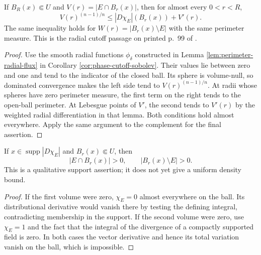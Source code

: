 \begin{proposition}\label{prop:phase-radial-sobolev}
If $B_R(x)\Subset U$ and $V(r)=|E\cap B_r(x)|$, then for almost every $0<r<R$,
\[
 V(r)^{(n-1)/n}\leq |D\chi_E|(B_r(x))+V'(r).
\]
The same inequality holds for $W(r)=|B_r(x)\setminus E|$ with the same perimeter measure. This is the radial cutoff passage on printed p.~99 of \cite{Sim18}.
\end{proposition}
\begin{proof}
Use the smooth radial functions $\phi_\delta$ constructed in Lemma \ref{lem:perimeter-radial-flux} in Corollary \ref{cor:phase-cutoff-sobolev}. Their values lie between zero and one and tend to the indicator of the closed ball. Its sphere is volume-null, so dominated convergence makes the left side tend to $V(r)^{(n-1)/n}$. At radii whose spheres have zero perimeter measure, the first term on the right tends to the open-ball perimeter. At Lebesgue points of $V'$, the second tends to $V'(r)$ by the weighted radial differentiation in that lemma. Both conditions hold almost everywhere. Apply the same argument to the complement for the final assertion.
\end{proof}

\begin{lemma}\label{lem:perimeter-support-two-phases}
If $x\in\operatorname{supp}|D\chi_E|$ and $B_r(x)\Subset U$, then
\[
 |E\cap B_r(x)|>0,\qquad |B_r(x)\setminus E|>0.
\]
This is a qualitative support assertion; it does not yet give a uniform density bound.
\end{lemma}
\begin{proof}
If the first volume were zero, $\chi_E=0$ almost everywhere on the ball. Its distributional derivative would vanish there by testing the defining integral, contradicting membership in the support. If the second volume were zero, use $\chi_E=1$ and the fact that the integral of the divergence of a compactly supported field is zero. In both cases the vector derivative and hence its total variation vanish on the ball, which is impossible.
\end{proof}

